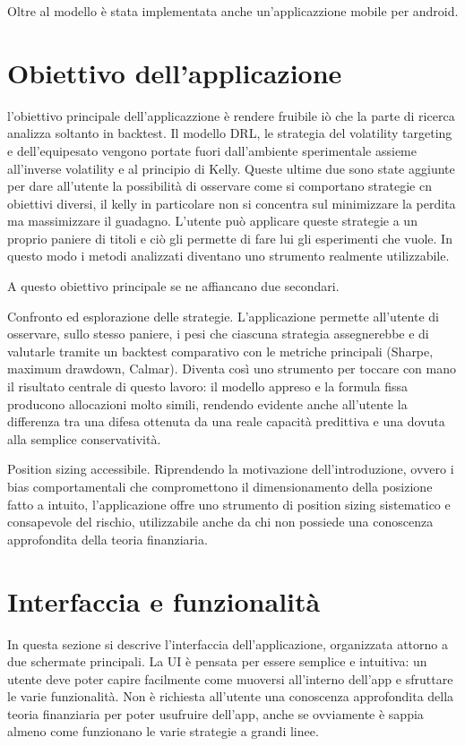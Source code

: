 Oltre al modello è stata implementata anche un'applicazzione mobile per android.

\section{Obiettivo dell'applicazione}
l'obiettivo principale dell'applicazzione è rendere fruibile iò che la parte di ricerca analizza soltanto in backtest.
Il modello DRL, le strategia del volatility targeting e dell'equipesato vengono portate fuori dall'ambiente sperimentale assieme all'inverse volatility e al principio di Kelly.
Queste ultime due sono state aggiunte per dare all'utente la possibilità di osservare come si comportano strategie cn obiettivi diversi, il kelly in particolare non si concentra sul minimizzare la perdita ma massimizzare il guadagno.
L'utente può applicare queste strategie a un proprio paniere di titoli e ciò gli permette di fare lui gli esperimenti che vuole.
In questo modo i metodi analizzati diventano uno strumento realmente utilizzabile.


A questo obiettivo principale se ne affiancano due secondari.

Confronto ed esplorazione delle strategie.
L'applicazione permette all'utente di osservare, sullo stesso paniere, i pesi che ciascuna strategia assegnerebbe e di valutarle tramite un backtest comparativo con le metriche principali (Sharpe, maximum drawdown, Calmar). 
Diventa così uno strumento per toccare con mano il risultato centrale di questo lavoro: il modello appreso e la formula fissa producono allocazioni molto simili, rendendo evidente anche all'utente la differenza tra una difesa ottenuta da una reale capacità predittiva e una dovuta alla semplice conservatività.

Position sizing accessibile.
Riprendendo la motivazione dell'introduzione, ovvero i bias comportamentali che compromettono il dimensionamento della posizione fatto a intuito, l'applicazione offre uno strumento di position sizing sistematico e consapevole del rischio, utilizzabile anche da chi non possiede una conoscenza approfondita della teoria finanziaria.
\section{Interfaccia e funzionalità}
\label{sec:ui}

In questa sezione si descrive l'interfaccia dell'applicazione, organizzata attorno a due schermate principali.
La UI è pensata per essere semplice e intuitiva: un utente deve poter capire facilmente come muoversi all'interno dell'app e sfruttare le varie funzionalità.
Non è richiesta all'utente una conoscenza approfondita della teoria finanziaria per poter usufruire dell'app, anche se ovviamente è sappia almeno come funzionano le varie strategie a grandi linee.


